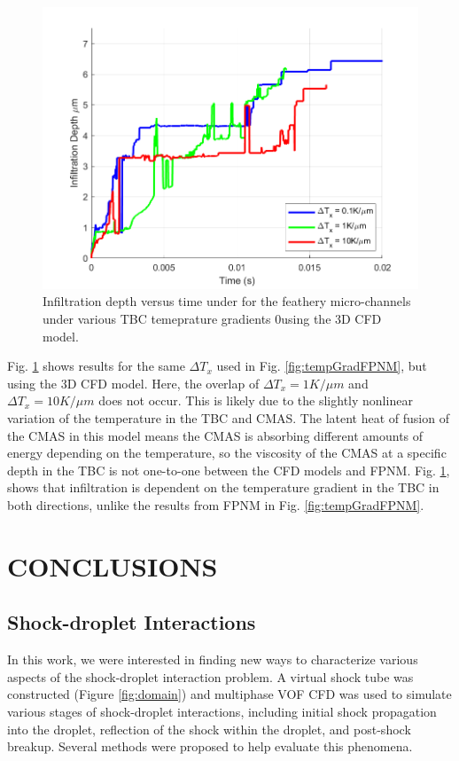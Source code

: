 \documentclass{UCF_ETD}
\begin{document}
\begin{figure}[htp!]
    \centering
    \includegraphics[width=\linewidth]{Figures/tempGradStudyCFD.png}
    \caption{Infiltration depth versus time under for the feathery micro-channels under various TBC temeprature gradients 0using the 3D CFD model.}
    \label{fig:tempGradCFD}
\end{figure}

Fig. \ref{fig:tempGradCFD} shows results for the same $\Delta T_{x}$ used in Fig. \ref{fig:tempGradFPNM}, but using the 3D CFD model. Here, the overlap of $\Delta T_{x} = 1 K/\mu m$ and $\Delta T_{x} = 10 K/\mu m$ does not occur. This is likely due to the slightly nonlinear variation of the temperature in the TBC and CMAS. The latent heat of fusion of the CMAS in this model means the CMAS is absorbing different amounts of energy depending on the temperature, so the viscosity of the CMAS at a specific depth in the TBC is not one-to-one between the CFD models and FPNM.  Fig. \ref{fig:tempGradCFD}, shows that infiltration is dependent on the temperature gradient in the TBC in both directions, unlike the results from FPNM in Fig. \ref{fig:tempGradFPNM}. 


\chapter{CONCLUSIONS}
\section{Shock-droplet Interactions}
\label{sec:shockdrop_conc}

In this work, we were interested in finding new ways to characterize various aspects of the shock-droplet interaction problem. A virtual shock tube was constructed (Figure \ref{fig:domain}) and multiphase VOF CFD was used to simulate various stages of shock-droplet interactions, including initial shock propagation into the droplet, reflection of the shock within the droplet, and post-shock breakup. Several methods were proposed to help evaluate this phenomena. 
\end{document}
